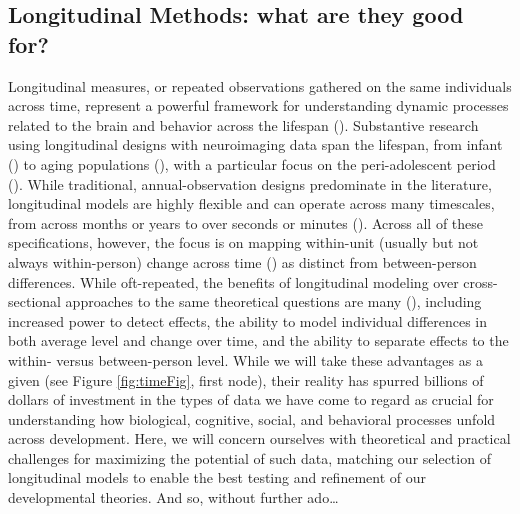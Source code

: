 \documentclass[11pt]{article}
\begin{document}
\subsection{Longitudinal Methods: what are they good for?}
Longitudinal measures, or repeated observations gathered on the same individuals across time, represent a powerful framework for understanding dynamic processes related to the brain and behavior across the lifespan (\cite{mcardle_latent_2009,sorensen_recipe_2021}). Substantive research using longitudinal designs with neuroimaging data span the lifespan, from infant (\cite{cusack_methodological_2018,wen_first-year_2019}) to aging populations (\cite{kuo_roadmap_2020,miller_multimodal_2016}), with a particular focus on the peri-adolescent period (\cite{casey_adolescent_2018,mills_structural_2016,tamnes_diffusion_2018,telzer_methodological_2018,van_duijvenvoorde_what_2016}). While traditional, annual-observation designs predominate in the literature, longitudinal models are highly flexible and can operate across many timescales, from across months or years to over seconds or minutes (\cite{bolger_intensive_2013,hedeker_longitudinal_2006}). Across all of these specifications, however, the focus is on mapping within-unit (usually but not always within-person) change across time (\cite{curran_separation_2014,curran_disaggregation_2011,hamaker_critique_2015}) as distinct from between-person differences. While oft-repeated, the benefits of longitudinal modeling over cross-sectional approaches to the same theoretical questions are many (\cite{becht_modeling_2020,crone_changing_2015,curran_twelve_2010,curran_disaggregation_2011,curran_implications_2003,king_longitudinal_2018,kraemer_how_2000,louis_explaining_1986,maxwell_bias_2007, mccormick_multi-level_2021,molenaar_manifesto_2004,telzer_methodological_2018}), including increased power to detect effects, the ability to model individual differences in both average level and change over time, and the ability to separate effects to the within- versus between-person level. While we will take these advantages as a given (see Figure \ref{fig:timeFig}, first  node), their reality has spurred billions of dollars of investment in the types of data we have come to regard as crucial for understanding how biological, cognitive, social, and behavioral processes unfold across development. Here, we will concern ourselves with theoretical and practical challenges for maximizing the potential of such data, matching our selection of longitudinal models to enable the best testing and refinement of our developmental theories. And so, without further ado…
\end{document}
